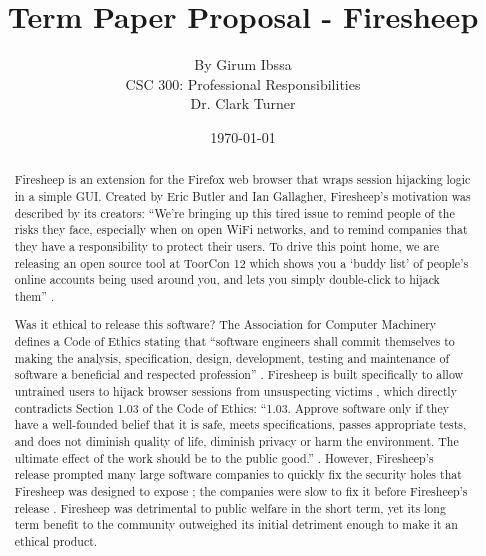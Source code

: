 \documentclass[12pt]{article}
\begin{document}
\title{\vfill Term Paper Proposal - Firesheep} %
\author{
By Girum Ibssa \vspace{10pt} \\
CSC 300: Professional Responsibilities  \vspace{10pt} \\
Dr. Clark Turner \vspace{10pt} \\
}
\date{\today} %

\maketitle

\vfill  %
\begin{abstract}
Firesheep is an extension for the Firefox web browser that wraps session hijacking logic in a simple GUI. Created by Eric Butler and Ian Gallagher, Firesheep's motivation was described by its creators: ``We're bringing up this tired issue to remind people of the risks they face, especially when on open WiFi networks, and to remind companies that they have a responsibility to protect their users. To drive this point home, we are releasing an open source tool at ToorCon 12 which shows you a `buddy list' of people's online accounts being used around you, and lets you simply double-click to hijack them'' \cite{security-now}.

Was it ethical to release this software? The Association for Computer Machinery defines a Code of Ethics stating that ``software engineers shall commit themselves to making the analysis, specification, design, development, testing and maintenance of software a beneficial and respected profession'' \cite{se-code}. Firesheep is built specifically to allow untrained users to hijack browser sessions from unsuspecting victims \cite{eric-butler}, which directly contradicts Section 1.03 of the Code of Ethics: ``1.03. Approve software only if they have a well-founded belief that it is safe, meets specifications, passes appropriate tests, and does not diminish quality of life, diminish privacy or harm the environment. The ultimate effect of the work should be to the public good.'' \cite{se-code}. However, Firesheep's release prompted many large software companies to quickly fix the security holes that Firesheep was designed to expose \cite{disconnect-blog}; the companies were slow to fix it before Firesheep's release \cite{disconnect-blog}. Firesheep was detrimental to public welfare in the short term, yet its long term benefit to the community outweighed its initial detriment enough to make it an ethical product.
\end{abstract}
\thispagestyle{empty} %
\newpage
\end{document}
